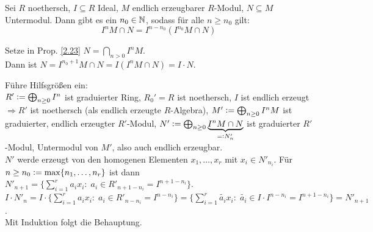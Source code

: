 \documentclass[a4paper, 10pt]{report}
\begin{document}
\begin{Prop}
\label{2.23}
  Sei $R$ noethersch, $I \subseteq R$ Ideal, $M$ endlich erzeugbarer $R$-Modul, $N \subseteq M$ Untermodul.
  Dann gibt es ein $n_0 \in \mathbb{N}$, sodass für alle $n \geq n_0$ gilt:
  \[I^n M \cap N = I ^{n-n_0} (I^{n_0}M \cap N)\]
\end{Prop}

\begin{Bew}
  Setze in Prop. \ref{2.23} $N = \bigcap_{n > 0} I^n M$.\\
  Dann ist $N = I^{n_0 +1} M \cap N = I (I^n M \cap N) = I \cdot N$.
\end{Bew}

\begin{Bew}
  Führe Hilfsgrößen ein:\\
  $R' \mathrel{\mathop:}= \bigoplus_{n \geq 0} I^n$ ist graduierter Ring, $R_0' = R$ ist noethersch, $I$ ist endlich erzeugt $\Rightarrow R'$ ist noethersch (als endlich erzeugte $R$-Algebra), $M' \mathrel{\mathop:}= \bigoplus_{n \geq 0} I^n M$ ist graduierter, endlich erzeugter $R'$-Modul, $N' \mathrel{\mathop:}= \bigoplus_{n \geq 0} \underset{=\mathrel{\mathop:} N'_n}{\underbrace{I^nM \cap N}}$ ist graduierter $R'$-Modul, Untermodul von $M'$, also auch endlich erzeugbar.\\
  $N'$ werde erzeugt von den homogenen Elementen $x_1, \dots, x_r$ mit $x_i \in N'_{n_i}$.
  Für $n \geq n_0 \mathrel{\mathop:}= \max \{n_1, \dots, n_r\}$ ist dann $N'_{n+1} = \{\sum_{i=1}^r a_i x_i: \; a_i \in R'_{n+1-n_i} = I^{n+1-n_i}\}$. $I \cdot N'_n = I \cdot \{\sum_{i=1}^r a_i x_i: \; a_i \in R'_{n-n_i} = I^{n-n_i}\} = \{\sum_{i=1}^r \tilde{a_i} x_i: \; \tilde{a_i} \in I \cdot I^{n-n_i} = I^{n+1-n_i}\} = N'_{n+1}$.\\
  Mit Induktion folgt die Behauptung.
\end{Bew}
\end{document}
